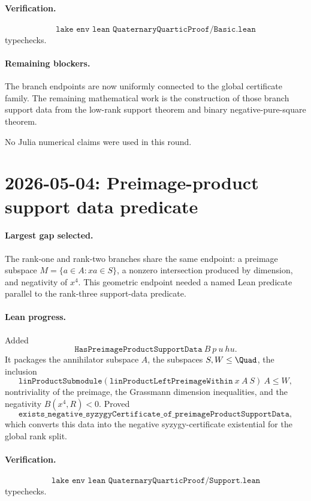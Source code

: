 \documentclass[11pt]{article}
\begin{document}
\paragraph{Verification.}
\[
\texttt{lake env lean QuaternaryQuarticProof/Basic.lean}
\]
typechecks.

\paragraph{Remaining blockers.}
The branch endpoints are now uniformly connected to the global certificate
family.  The remaining mathematical work is the construction of those branch
support data from the low-rank support theorem and binary negative-pure-square
theorem.

No Julia numerical claims were used in this round.

\section*{2026-05-04: Preimage-product support data predicate}

\paragraph{Largest gap selected.}
The rank-one and rank-two branches share the same endpoint: a preimage
subspace \(M=\{a\in A:xa\in S\}\), a nonzero intersection produced by
dimension, and negativity of \(x^4\).  This geometric endpoint needed a named
Lean predicate parallel to the rank-three support-data predicate.

\paragraph{Lean progress.}
Added
\[
\texttt{HasPreimageProductSupportData}\ B\ p\ u\ hu.
\]
It packages the annihilator subspace \(A\), the subspaces \(S,W\le\Quad\),
the inclusion
\[
\texttt{linProductSubmodule}
  (\texttt{linProductLeftPreimageWithin}\ x\ A\ S)\ A\le W,
\]
nontriviality of the preimage, the Grassmann dimension inequalities, and
the negativity \(B(x^4,R)<0\).  Proved
\[
\texttt{exists\_negative\_syzygyCertificate\_of\_preimageProductSupportData},
\]
which converts this data into the negative syzygy-certificate existential for
the global rank split.

\paragraph{Verification.}
\[
\texttt{lake env lean QuaternaryQuarticProof/Support.lean}
\]
typechecks.
\end{document}
